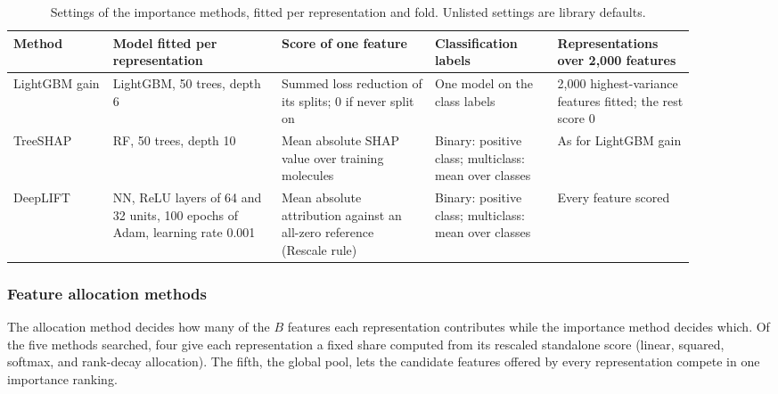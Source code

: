 \begin{table}[htbp]
\centering
\small
\begin{adjustbox}{max width=\textwidth,max totalheight=0.78\textheight}
\begin{tabular}{@{}P{0.13\linewidth}P{0.22\linewidth}P{0.20\linewidth}P{0.16\linewidth}P{0.18\linewidth}@{}}
\toprule
Method & Model fitted per representation & Score of one feature & Classification labels & Representations over 2{,}000 features \\
\midrule
LightGBM gain & LightGBM, 50 trees, depth 6 & Summed loss reduction of its splits; 0 if never split on & One model on the class labels & 2{,}000 highest-variance features fitted; the rest score 0 \\
TreeSHAP & RF, 50 trees, depth 10 & Mean absolute SHAP value over training molecules & Binary: positive class; multiclass: mean over classes & As for LightGBM gain \\
DeepLIFT & NN, ReLU layers of 64 and 32 units, 100 epochs of Adam, learning rate 0.001 & Mean absolute attribution against an all-zero reference (Rescale rule) & Binary: positive class; multiclass: mean over classes & Every feature scored \\
\bottomrule
\end{tabular}
\end{adjustbox}
\caption[Settings of the importance methods.]{Settings of the importance methods, fitted per representation and fold. Unlisted settings are library defaults.}
\label{tab:importance_methods}
\end{table}

\subsubsection{Feature allocation methods}\label{sec:method:allocation}

The allocation method decides how many of the $B$ features each representation contributes while the importance method decides which. Of the five methods searched, four give each representation a fixed share computed from its rescaled standalone score (linear, squared, softmax, and rank-decay allocation). The fifth, the global pool, lets the candidate features offered by every representation compete in one importance ranking.

